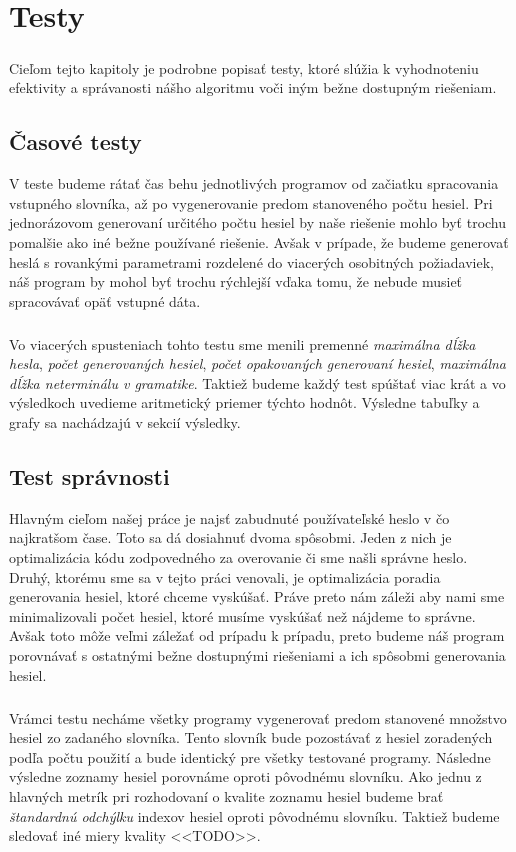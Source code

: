 \chapter{Testy}

\paragraph{}
Cieľom tejto kapitoly je podrobne popisať testy, ktoré slúžia k vyhodnoteniu efektivity a správanosti nášho algoritmu voči iným bežne dostupným riešeniam.

\section{Časové testy}
V teste budeme rátať čas behu jednotlivých programov od začiatku spracovania vstupného slovníka, až po vygenerovanie predom stanoveného počtu hesiel. Pri jednorázovom generovaní určitého počtu hesiel by naše riešenie mohlo byť trochu pomalšie ako iné bežne používané riešenie. Avšak v prípade, že budeme generovať heslá s rovankými parametrami rozdelené do viacerých osobitných požiadaviek, náš program by mohol byť trochu rýchlejší vďaka tomu, že nebude musieť spracovávať opäť vstupné dáta. 

\paragraph{}
Vo viacerých spusteniach tohto testu sme menili premenné \emph{maximálna dĺžka hesla}, \emph{počet generovaných hesiel}, \emph{počet opakovaných generovaní hesiel}, \emph{maximálna dĺžka neterminálu v gramatike}. Taktiež budeme každý test spúštať viac krát a vo výsledkoch uvedieme aritmetický priemer týchto hodnôt. Výsledne tabuľky a grafy sa nachádzajú v sekcií výsledky.

\section{Test správnosti}
Hlavným cieľom našej práce je najsť zabudnuté používateľské heslo v čo najkratšom čase. Toto sa dá dosiahnuť dvoma spôsobmi. Jeden z nich je optimalizácia kódu zodpovedného za overovanie či sme našli správne heslo. Druhý, ktorému sme sa v tejto práci venovali, je optimalizácia poradia generovania hesiel, ktoré chceme vyskúšať. Práve preto nám záleži aby nami sme minimalizovali počet hesiel, ktoré musíme vyskúšať než nájdeme to správne. Avšak toto môže veľmi záležať od prípadu k prípadu, preto budeme náš program porovnávať s ostatnými bežne dostupnými riešeniami a ich spôsobmi generovania hesiel. 

\paragraph{}
Vrámci testu necháme všetky programy vygenerovať predom stanovené množstvo hesiel zo zadaného slovníka. Tento slovník bude pozostávať z hesiel zoradených podľa počtu použití a bude identický pre všetky testované programy. Následne výsledne zoznamy hesiel porovnáme oproti pôvodnému slovníku. Ako jednu z hlavných metrík pri rozhodovaní o kvalite zoznamu hesiel budeme brať \emph{štandardnú odchýlku} indexov hesiel oproti pôvodnému slovníku. Taktiež budeme sledovať iné miery kvality <<TODO>>.
